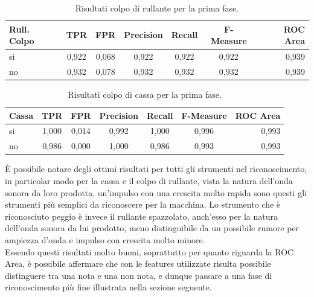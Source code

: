 \begin{table}[h!]
	\begin{center}
		\begin{tabular}{l|c|c|c|c|c|r} %
			\textbf{Rull. Colpo} & \textbf{TPR} & \textbf{FPR} & \textbf{Precision} & \textbf{Recall} & \textbf{F-Measure} & \textbf{ROC Area}\\
			\hline
			si & 0,922 & 0,068 & 0,922 & 0,922 & 0,922 & 0,939 \\
			no & 0,932 & 0,078 & 0,932 & 0,932 & 0,932 & 0,939 \\
		\end{tabular}
		\caption{Risultati colpo di rullante per la prima fase.}
		\label{tab:sn_hit_res_1}
	\end{center}
\end{table}

\begin{table}[h!]
	\begin{center}
		\begin{tabular}{l|c|c|c|c|c|r} %
			\textbf{Cassa} & \textbf{TPR} & \textbf{FPR} & \textbf{Precision} & \textbf{Recall} & \textbf{F-Measure} & \textbf{ROC Area}\\
			\hline
			si & 1,000 & 0,014 & 0,992 & 1,000 & 0,996 & 0,993 \\
			no & 0,986 & 0,000 & 1,000 & 0,986 & 0,993 & 0,993 \\
		\end{tabular}
		\caption{Risultati colpo di cassa per la prima fase.}
		\label{tab:kick_res_1}
	\end{center}
\end{table}


È possibile notare degli ottimi risultati per tutti gli strumenti nel riconoscimento, in particolar modo per la cassa e il colpo di rullante, vista la natura dell'onda sonora da loro prodotta, un'impulso con una crescita molto rapida sono questi gli strumenti più semplici da riconoscere per la macchina. Lo strumento che è riconosciuto peggio è invece il rullante spazzolato, anch'esso per la natura dell'onda sonora da lui prodotto, meno distinguibile da un possibile rumore per ampiezza d'onda e impulso con crescita molto minore.\\
Essendo questi risultati molto buoni, soprattutto per quanto riguarda la ROC Area, è possibile affermare che con le features utilizzate risulta possibile distinguere tra una nota e una non nota, e dunque passare a una fase di riconoscimento più fine illustrata nella sezione seguente.\\

